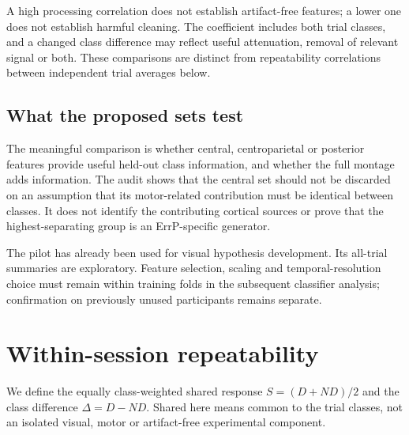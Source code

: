 \documentclass[11pt,a4paper]{article}
\begin{document}
A high processing correlation does not establish artifact-free features; a lower one does not establish harmful cleaning. The coefficient includes both trial classes, and a changed class difference may reflect useful attenuation, removal of relevant signal or both. These comparisons are distinct from repeatability correlations between independent trial averages below.
\subsection{What the proposed sets test}
The meaningful comparison is whether central, centroparietal or posterior features provide useful held-out class information, and whether the full montage adds information. The audit shows that the central set should not be discarded on an assumption that its motor-related contribution must be identical between classes. It does not identify the contributing cortical sources or prove that the highest-separating group is an ErrP-specific generator.

The pilot has already been used for visual hypothesis development. Its all-trial summaries are exploratory. Feature selection, scaling and temporal-resolution choice must remain within training folds in the subsequent classifier analysis; confirmation on previously unused participants remains separate.
\clearpage
\section{Within-session repeatability}
We define the equally class-weighted shared response $S=(D+ND)/2$ and the class difference $\Delta=D-ND$. Shared here means common to the trial classes, not an isolated visual, motor or artifact-free experimental component.
\end{document}
